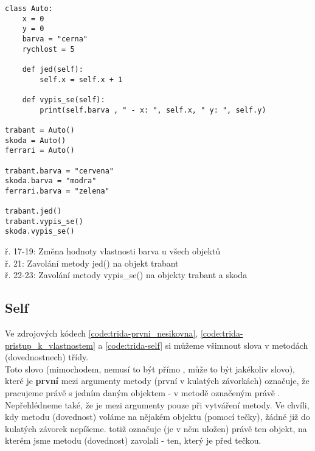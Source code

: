 \begin{minipage}[t]{.45\textwidth}
\begin{code}
\begin{verbatim}
class Auto:
	x = 0
	y = 0
	barva = "cerna"
	rychlost = 5
	
	def jed(self):
		self.x = self.x + 1
		
	def vypis_se(self):
		print(self.barva , " - x: ", self.x, " y: ", self.y)
		
trabant = Auto()
skoda = Auto()
ferrari = Auto()

trabant.barva = "cervena"
skoda.barva = "modra"
ferrari.barva = "zelena"

trabant.jed()
trabant.vypis_se()
skoda.vypis_se()
\end{verbatim}
\label{code:trida-pristup_k_vlastnostem}
\end{code}
\end{minipage}
\begin{minipage}[t]{.45\textwidth}
ř. 17-19:	Změna hodnoty vlastnosti barva u všech objektů\\
ř. 21:		Zavolání metody jed() na objekt trabant\\
ř. 22-23:	Zavolání metody vypis\_se() na objekty trabant a skoda
\end{minipage}


\subsection{Self}
Ve zdrojových kódech \ref{code:trida-prvni_nesikovna}, \ref{code:trida-pristup_k_vlastnostem} a \ref{code:trida-self} si můžeme všimnout slova  v metodách (dovednostnech) třídy.\\
Toto slovo (mimochodem, nemusí to být přímo , může to být jakékoliv slovo), které je \textbf{první} mezi argumenty metody (první v kulatých závorkách) označuje, že pracujeme právě s jedním daným objektem - v metodě označeným právě .\\
Nepřehlédneme také, že  je mezi argumenty pouze při vytváření metody. Ve chvíli, kdy metodu (dovednost) voláme na nějakém objektu (pomocí tečky), žádné  již do kulatých závorek nepíšeme.  totiž označuje (je v něm uložen) právě ten objekt, na kterém jsme metodu (dovednost) zavolali - ten, který je před tečkou.\\


